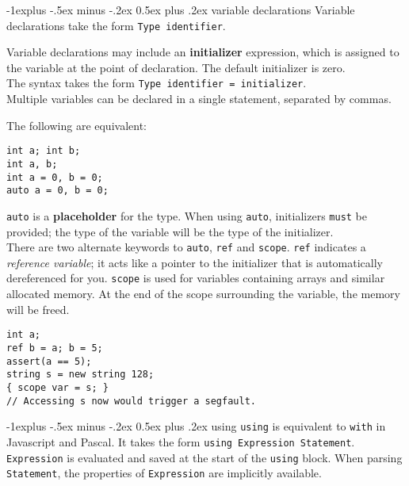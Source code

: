 \documentclass[a4paper,10pt,landscape]{article}
\makeatletter
\newenvironment{segment}[1]
{\begin{mdframed}[roundcorner=5pt]\subsection{#1}}
{\end{mdframed}\vspace{2pt plus 5pt}}
\newcommand{\important}[1]{\textbf{#1}}
\renewcommand{\subsection}{\@startsection{subsection}{2}{0mm}%
			      {-1explus -.5ex minus -.2ex}%
			      {0.5ex plus .2ex}%
			      {\normalfont\normalsize\bfseries}}
\makeatother
\begin{document}
\begin{multicols}{3}
\begin{segment}{variable declarations}
Variable declarations take the form \texttt{Type identifier}.

Variable declarations may include an \important{initializer} expression, which is assigned
to the variable at the point of declaration. The default initializer is zero.\\
The syntax takes the form \texttt{Type identifier = initializer}.\\
Multiple variables can be declared in a single statement, separated by commas.

The following are equivalent:

\begin{lstlisting}
int a; int b;
int a, b;
int a = 0, b = 0;
auto a = 0, b = 0;
\end{lstlisting}
\texttt{auto} is a \important{placeholder} for the type. When using \texttt{auto}, initializers
\texttt{must} be provided; the type of the variable will be the type of the initializer.\\

There are two alternate keywords to \texttt{auto}, \texttt{ref} and \texttt{scope}.
\texttt{ref} indicates a \emph{reference variable}; it acts like a pointer to the initializer that
is automatically dereferenced for you.
\texttt{scope} is used for variables containing arrays and similar allocated memory. At the end of
the scope surrounding the variable, the memory will be freed.

\begin{lstlisting}
int a;
ref b = a; b = 5;
assert(a == 5);
string s = new string 128;
{ scope var = s; }
// Accessing s now would trigger a segfault.
\end{lstlisting}

\end{segment}
\begin{segment}{using}
\texttt{using} is equivalent to \texttt{with} in Javascript and Pascal. It takes the form
\texttt{using Expression Statement}. \texttt{Expression} is evaluated and saved at the start
of the \texttt{using} block.
When parsing \texttt{Statement}, the properties of \texttt{Expression} are implicitly available.
\end{segment}
\columnbreak

\end{multicols}
\end{document}
